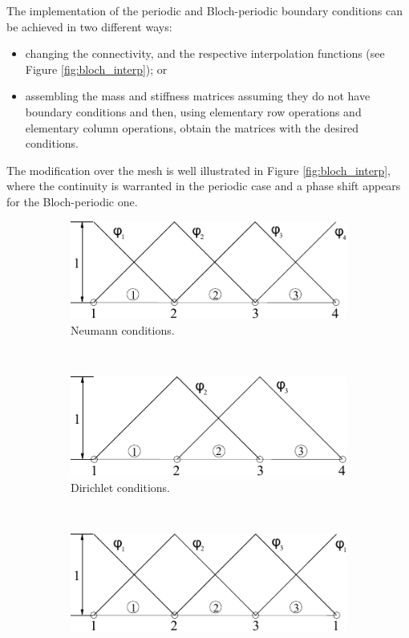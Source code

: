 The implementation of the periodic and Bloch-periodic boundary conditions can be achieved in two different ways:
\begin{itemize}
\item changing the connectivity, and the respective interpolation functions (see Figure \ref{fig:bloch_interp}); or
\item assembling the mass and stiffness matrices assuming they do not have boundary conditions and then, using elementary row operations and elementary column operations, obtain the matrices with the desired conditions.
\end{itemize}
The modification over the mesh is well illustrated in Figure \ref{fig:bloch_interp}, where the continuity is warranted in the periodic case and a phase shift appears for the Bloch-periodic one.
\begin{figure}[H]
\centering
	\begin{subfigure}[b]{0.4\textwidth}\qquad
		\includegraphics[width=\textwidth]{img/periodic-interpolation-a.pdf}
		\caption{Neumann conditions. }
	\end{subfigure}\,
%
	\begin{subfigure}[b]{0.4\textwidth}\qquad
		\includegraphics[width=\textwidth]{img/periodic-interpolation-b.pdf}
		\caption{Dirichlet conditions.}
	\end{subfigure}\\
%
	\begin{subfigure}[b]{0.4\textwidth}\qquad
		\includegraphics[width=\textwidth]{img/periodic-interpolation-c.pdf}

\end{subfigure}
\end{figure}
